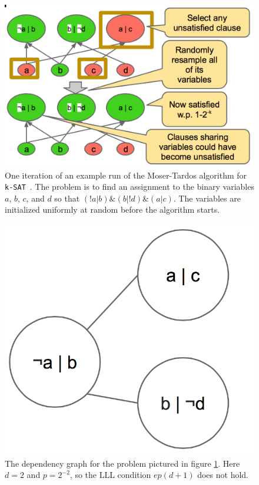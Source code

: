 \documentclass{article}
\newcommand{\ksat}{\texttt{k-SAT}~}
\begin{document}
\begin{figure}[ht]
  \begin{mdframed}
    \centering
    \includegraphics[scale=0.5]{figures/mt-directed-example.png}
    \caption{One iteration of an example run of the Moser-Tardos algorithm for \ksat.  The problem is to find an assignment to the binary variables $a$, $b$, $c$, and $d$ so that $(!a|b)\&(b|!d)\&(a|c)$.  The variables are initialized uniformly at random before the algorithm starts.}
    \label{fig:mt-directed-example}
  \end{mdframed}
\end{figure}

\begin{figure}[ht]
  \begin{mdframed}
    \centering
    \includegraphics[scale=0.5]{figures/mt-undirected-example.png}
    \caption{The dependency graph for the problem pictured in figure \ref{fig:mt-directed-example}.  Here $d = 2$ and $p = 2^{-2}$, so the LLL condition $e p (d + 1)$ does not hold.}
    \label{fig:mt-undirected-example}
  \end{mdframed}
\end{figure}
\end{document}
